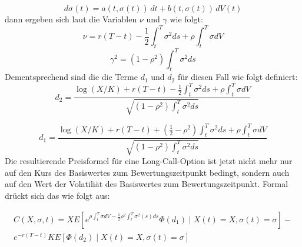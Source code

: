 \documentclass[12pt,a4paper,headsepline,bibliography=totoc,listof=totoc,headinclude=false,footinclude=false,BCOR5mm]{scrreprt} %
\begin{document}
\begin{equation} \label{stochvola2}d\sigma(t)=  a(t,\sigma(t)) \, dt +  b(t,\sigma(t)) \, dV(t) 
\end{equation}
dann ergeben sich laut \cite[S. 242]{Singer1999} die Variablen $\nu$ und $\gamma$ wie folgt:
  \begin{equation} \label{nu}
\nu = r(T-t) - \frac{1}{2} \int_t^T \sigma^2 ds + \rho \int_t^T \sigma dV
\end{equation}
  \begin{equation} \label{gamma}
\gamma^2 = (1-\rho^2) \int_t^T \sigma^2 ds 
\end{equation}
Dementsprechend sind die die Terme $d_1$ und $d_2$ f\"ur diesen Fall wie folgt definiert:
  \begin{equation} \label{d2}
d_2 =\frac{ \log(X/K)+ r(T-t) - \frac{1}{2} \int_t^T \sigma^2 ds + \rho \int_t^T \sigma dV}{\sqrt{(1-\rho^2) \int_t^T \sigma^2 ds}}
\end{equation}

  \begin{equation} \label{d1}
d_1 =\frac{ \log(X/K)+ r(T-t)+ (\frac{1}{2}-\rho^2) \int_t^T \sigma^2 ds + \rho \int_t^T \sigma dV}{\sqrt{(1-\rho^2) \int_t^T \sigma^2 ds}}
\end{equation}
Die resultierende Preisformel f\"ur eine Long-Call-Option ist jetzt nicht mehr nur auf den Kurs des Basiswertes zum Bewertungszeitpunkt bedingt, sondern auch auf den Wert der Volatili\"at des Basiswertes zum Bewertungszeitpunkt. Formal dr\"uckt sich das wie folgt aus:

 \begin{equation} \label{fkstoch}\begin{split}
C(X,\sigma,t) =X E\left[ e^{\rho \int_{t}^{T} \sigma dV -\frac{1}{2} \rho^2\int_{t}^{T}\sigma^2(s)ds} \Phi(d_1) \mid X(t) = X, \sigma(t) = \sigma \right] - \\ 
e^{-r(T-t)}K E\left[\Phi(d_2) \mid X(t) = X, \sigma(t) = \sigma \right] 
\end{split}
\end{equation}
\end{document}
